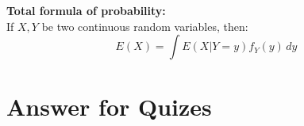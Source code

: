 \documentclass{article}
\begin{document}
\begin{theorem}
    \textbf{Total formula of probability:}\\
    If $X,Y$ be two continuous random variables, then:
    \begin{equation*}
        E(X) = \int E(X|Y = y)f_Y(y) \, dy
    \end{equation*}
\end{theorem}













\newpage

\newpage
\appendix


\section{Answer for Quizes}
\end{document}

